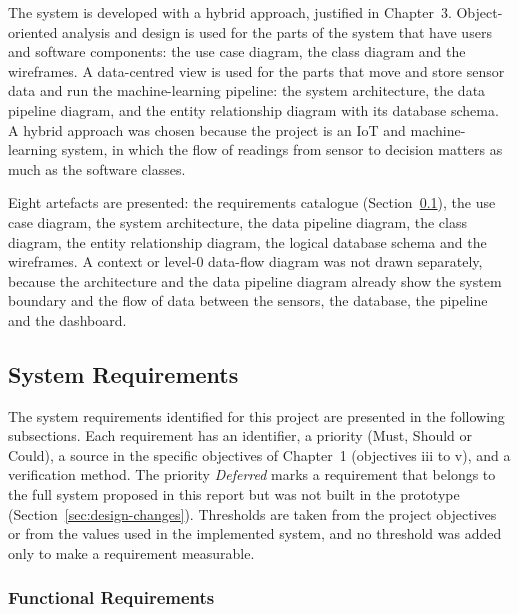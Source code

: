\documentclass[12pt, a4paper]{article}
\begin{document}
The system is developed with a hybrid approach, justified in Chapter~3. Object-oriented analysis and design is used for the parts of the system that have users and software components: the use case diagram, the class diagram and the wireframes. A data-centred view is used for the parts that move and store sensor data and run the machine-learning pipeline: the system architecture, the data pipeline diagram, and the entity relationship diagram with its database schema. A hybrid approach was chosen because the project is an IoT and machine-learning system, in which the flow of readings from sensor to decision matters as much as the software classes.

Eight artefacts are presented: the requirements catalogue (Section~\ref{sec:requirements}), the use case diagram, the system architecture, the data pipeline diagram, the class diagram, the entity relationship diagram, the logical database schema and the wireframes. A context or level-0 data-flow diagram was not drawn separately, because the architecture and the data pipeline diagram already show the system boundary and the flow of data between the sensors, the database, the pipeline and the dashboard.

\subsection{System Requirements}
\label{sec:requirements}

The system requirements identified for this project are presented in the following subsections. Each requirement has an identifier, a priority (Must, Should or Could), a source in the specific objectives of Chapter~1 (objectives iii to v), and a verification method. The priority \emph{Deferred} marks a requirement that belongs to the full system proposed in this report but was not built in the prototype (Section~\ref{sec:design-changes}). Thresholds are taken from the project objectives or from the values used in the implemented system, and no threshold was added only to make a requirement measurable.

\subsubsection{Functional Requirements}
\end{document}
